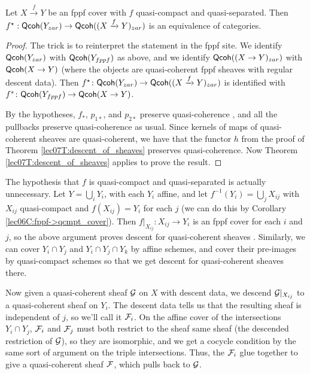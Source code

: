 \begin{theorem}\label{lec07T:descent_qcoh_sheaves}
 Let $X\xrightarrow f Y$ be an fppf cover with $f$ quasi-compact and quasi-separated. Then $f^\star:\text{\sf Qcoh}(Y_{zar})\to \text{\sf Qcoh}((X\xrightarrow f Y)_{zar})$ is an equivalence of categories.
\end{theorem}
\begin{proof}
 The trick is to reinterpret the statement in the fppf site. We identify $\text{\sf Qcoh}(Y_{zar})$ with $\text{\sf Qcoh}(Y_{fppf})$ as above, and we identify $\text{\sf Qcoh}((X\to Y)_{zar})$ with $\text{\sf Qcoh}(X\to Y)$ (where the objects are quasi-coherent fppf sheaves with regular descent data). Then $f^\star\colon \text{\sf Qcoh}(Y_{zar})\to \text{\sf Qcoh}((X\xrightarrow f Y)_{zar})$ is identified with $f^*\colon \text{\sf Qcoh}(Y_{fppf})\to \text{\sf Qcoh}(X\to Y)$.

 By the hypotheses, $f_*$, $p_{1*}$, and $p_{2*}$ preserve quasi-coherence \cite[II.5.8]{Hartshorne}, and all the pullbacks preserve quasi-coherence as usual. Since kernels of maps of quasi-coherent sheaves are quasi-coherent, we have that the functor $h$ from the proof of Theorem \ref{lec07T:descent_of_sheaves} preserves quasi-coherence. Now Theorem \ref{lec07T:descent_of_sheaves} applies to prove the result.
\end{proof}
\begin{remark}
 The hypothesis that $f$ is quasi-compact and quasi-separated is actually unnecessary. Let $Y=\bigcup_i Y_i$, with each $Y_i$ affine, and let $f^{-1}(Y_i)=\bigcup_{j} X_{ij}$ with $X_{ij}$ quasi-compact and $f(X_{ij})=Y_i$ for each $j$ (we can do this by Corollary \ref{lec06C:fppf->qcmpt_cover}). Then $f|_{X_{ij}}:X_{ij}\to Y_i$ is an fppf cover for each $i$ and $j$, so the above argument proves descent for quasi-coherent sheaves . Similarly, we can cover $Y_i\cap Y_j$ and $Y_i\cap Y_j\cap Y_k$ by affine schemes, and cover their pre-images by quasi-compact schemes so that we get descent for quasi-coherent sheaves there.

 Now given a quasi-coherent sheaf $\mathcal{G}$ on $X$ with descent data, we descend $\mathcal{G}|_{X_{ij}}$ to a quasi-coherent sheaf on $Y_i$. The descent data tells us  that the resulting sheaf is independent of $j$, so we'll call it $\mathcal{F}_i$. On the affine cover of the intersections $Y_i\cap Y_j$,  $\mathcal{F}_i$ and $\mathcal{F}_j$ must both restrict to the sheaf same sheaf (the descended restriction of $\mathcal{G}$), so they are isomorphic, and we get a cocycle condition by the same sort of argument on the triple intersections. Thus, the $\mathcal{F}_i$ glue together to give a quasi-coherent sheaf $\mathcal{F}$, which pulls back to $\mathcal{G}$.
\end{remark}
